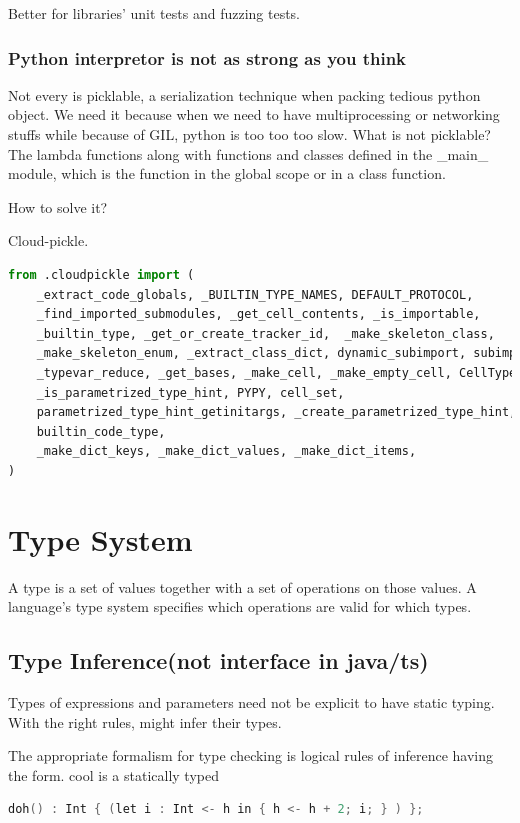 \documentclass[a4paper]{exam}
\theoremstyle{definition}
\begin{document}
Better for libraries' unit tests and fuzzing tests.

\subsubsection{Python interpretor is not as strong as you think}
Not every is picklable, a serialization technique when packing tedious python object. We need it because when we need to have multiprocessing or networking stuffs while because of GIL, python is too too too slow. What is not picklable?
The lambda functions along with functions and classes defined in the \_main\_ module, which is the function in the global scope or in a class function.

How to solve it?

Cloud-pickle.
\begin{lstlisting}[language=Python]
from .cloudpickle import (
    _extract_code_globals, _BUILTIN_TYPE_NAMES, DEFAULT_PROTOCOL,
    _find_imported_submodules, _get_cell_contents, _is_importable,
    _builtin_type, _get_or_create_tracker_id,  _make_skeleton_class,
    _make_skeleton_enum, _extract_class_dict, dynamic_subimport, subimport,
    _typevar_reduce, _get_bases, _make_cell, _make_empty_cell, CellType,
    _is_parametrized_type_hint, PYPY, cell_set,
    parametrized_type_hint_getinitargs, _create_parametrized_type_hint,
    builtin_code_type,
    _make_dict_keys, _make_dict_values, _make_dict_items,
)
\end{lstlisting}
\section{Type System}
A type is a set of values together with a set of operations on those values. A language's type system specifies which operations are valid for which types.

\subsection{Type Inference(not interface in java/ts)}
Types of expressions and parameters need not be explicit to have static typing. With the right rules, might infer their types.

The appropriate formalism for type checking is logical rules of inference having the form. cool is a statically typed

\begin{lstlisting}[language=C]
  doh() : Int { (let i : Int <- h in { h <- h + 2; i; } ) };
\end{lstlisting}
\end{document}
